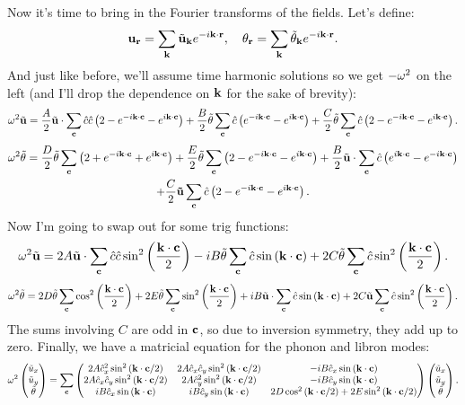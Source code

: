 \documentclass[12pt]{article}
\begin{document}
Now it's time to bring in the Fourier transforms of the fields. Let's define:
\[ \bv u_\br = \sum_{\bv k} \tilde{\bv u}_{\bv k} e^{-i \Dot k r},\quad \th_\br = \sum_{\bv k} \tilde \th_{\bv k} e^{-i \Dot k r}.\]
And just like before, we'll assume time harmonic solutions so we get $-\w^2$ on the left (and I'll drop the dependence on $\bv k$ for the sake of brevity):
\[ \w^2  \tilde{\bv u} = \half{A} \tilde{\bv u} \cdot \sum_{\bv c} \hat c \hat c \paren{2 - e^{-i\Dot k c} - e^{i \Dot k c}} + \half{B} \tilde \th \sum_{\bv c} \hat c\paren{e^{-i \Dot k c} - e^{i \Dot k c}} + \half{C} \tilde \th \sum_{\bv c} \hat c \paren{2 - e^{-i \Dot k c} - e^{i \Dot k c}}.\]
\begin{multline*} \w^2  \tilde \th = \half{D}\tilde \th \sum_{\bv c} \paren{2 + e^{-i \Dot k c} + e^{i \Dot k c}} + \half{E} \tilde \th \sum_{\bv c} \paren{ 2 - e^{- i \Dot k c} - e^{i \Dot k c}} + \half{B} \tilde{\bv u} \cdot \sum_{\bv c} \hat c \paren{e^{i \Dot k c} - e^{-i \Dot k c}} \\ + \half{C} \bv{\tilde u} \sum_{\bv c} \hat c \paren{2 - e^{-i \Dot k c} - e^{i \Dot k c}}. \end{multline*}
Now I'm going to swap out for some trig functions:
\[ \w^2  \tilde{\bv u} = 2A\tilde{\bv u} \cdot \sum_{\bv c} \hat c \hat c \sin^2\paren{\half{\Dot k c}} - i B\tilde \th \sum_{\bv c} \hat c\sinp{\Dot k c} + 2C \tilde \th \sum_{\bv c} \hat c \sin^2\paren{\half{\Dot k c}}.\]
\[ \w^2  \tilde \th = 2D\tilde \th \sum_{\bv c} \cos^2\paren{\half{\Dot k c}}+ 2E \tilde \th \sum_{\bv c} \sin^2\paren{\half{\Dot k c}} + iB \tilde{\bv u} \cdot \sum_{\bv c} \hat c \sinp{\Dot k c} + 2C \tilde{\bv u} \sum_{\bv c} \hat c \sin^2\paren{\half{\Dot k c}}.\]
The sums involving $C$ are odd in $\bv c$, so due to inversion symmetry, they add up to zero. Finally, we have a matricial equation for the phonon and libron modes:
\[ \w^2 \pmtrx{ \tilde u_x \\ \tilde u_y \\ \tilde \th} = \sum_{\bv c} \pmtrx{ 2A \hat c_x^2 \sin^2\paren{\Dot k c/2} & 2A \hat c_x \hat c_y \sin^2 \paren{\Dot k c/2} & - i B \hat c_x \sinp{\Dot k c} \\ 2A \hat c_x \hat c_y \sin^2\paren{\Dot k c/2} & 2A \hat c_y^2 \sin^2 \paren{\Dot k c/2} & - i B \hat c_y \sinp{\Dot k c} \\ i B \hat c_x \sinp{\Dot k c} & i B \hat c_y \sinp{\Dot k c} & 2D \cos^2\paren{\Dot k c/2} + 2E \sin^2 \paren{ \Dot k c/2}}  \pmtrx{ \tilde u_x \\ \tilde u_y \\ \tilde \th}. \]
\end{document}
